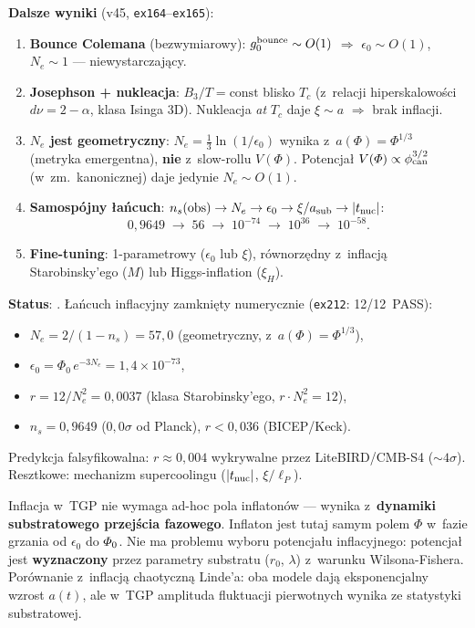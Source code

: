 \begin{remark}
\smallskip\noindent
\textbf{Dalsze wyniki} (v45, \texttt{ex164}--\texttt{ex165}):
\begin{enumerate}[nosep]
  \item \textbf{Bounce Colemana} (bezwymiarowy): $g_0^{\rm bounce} \sim O(1)$
    $\Rightarrow$ $\epsilon_0 \sim O(1)$, $N_e \sim 1$ --- niewystarczaj\k{a}cy.
  \item \textbf{Josephson + nukleacja}: $B_3/T = \text{const}$ blisko $T_c$
    (z~relacji hiperska\-lowości $d\nu = 2-\alpha$, klasa Isinga 3D).
    Nukleacja \emph{at} $T_c$ daje $\xi \sim a$ $\Rightarrow$ brak inflacji.
  \item \textbf{$N_e$ jest geometryczny}: $N_e = \tfrac{1}{3}\ln(1/\epsilon_0)$
    wynika z~$a(\Phi) = \Phi^{1/3}$ (metryka emergentna),
    \textbf{nie} z~slow-rollu $V(\Phi)$.
    Potencja\l{} $V(\Phi) \propto \phi_{\rm can}^{3/2}$ (w~zm.\ kanonicznej)
    daje jedynie $N_e \sim O(1)$.
  \item \textbf{Samospójny \l{}a\'ncuch}: $n_s(\text{obs}) \to N_e \to \epsilon_0
    \to \xi/a_{\rm sub} \to |t_{\rm nuc}|$:
    \[
      0{,}9649 \;\to\; 56 \;\to\; 10^{-74} \;\to\; 10^{36} \;\to\; 10^{-58}.
    \]
  \item \textbf{Fine-tuning}: 1-parametrowy ($\epsilon_0$ lub $\xi$),
    r\'ownorz\k{e}dny z~inflacj\k{a} Starobinsky'ego ($M$)
    lub Higgs-inflation ($\xi_H$).
\end{enumerate}

\smallskip\noindent
\textbf{Status}: .
\L{}a\'ncuch inflacyjny zamkni\k{e}ty numerycznie (\texttt{ex212}: 12/12~PASS):
\begin{itemize}[nosep]
  \item $N_e = 2/(1-n_s) = 57{,}0$ (geometryczny, z~$a(\Phi) = \Phi^{1/3}$),
  \item $\epsilon_0 = \Phi_0\,e^{-3N_e} = 1{,}4 \times 10^{-73}$,
  \item $r = 12/N_e^2 = 0{,}0037$ (klasa Starobinsky'ego, $r \cdot N_e^2 = 12$),
  \item $n_s = 0{,}9649$ ($0{,}0\sigma$ od Planck), $r < 0{,}036$ (BICEP/Keck).
\end{itemize}
Predykcja falsyfikowalna: $r \approx 0{,}004$ wykrywalne przez LiteBIRD/CMB-S4 ($\sim 4\sigma$).
Resztkowe: mechanizm supercoolingu ($|t_{\rm nuc}|$, $\xi/\ell_P$).
\end{remark}

\begin{remark}
Inflacja w~TGP nie wymaga ad-hoc pola inflaton\'ow ---
wynika z~\textbf{dynamiki substratowego przej\'scia fazowego}.
Inflaton jest tutaj samym polem $\Phi$ w~fazie grzania
od $\epsilon_0$ do $\PhiZero$. Nie ma problemu wyboru
potencja\l{}u inflacyjnego: potencja\l{} jest \textbf{wyznaczony}
przez parametry substratu ($r_0$, $\lambda$) z~warunku Wilsona-Fishera.
Por\'ownanie z~inflacj\k{a} chaotyczn\k{a} Linde'a: oba modele
daj\k{a} eksponencjalny wzrost $a(t)$, ale w~TGP amplituda
fluktuacji pierwotnych wynika ze statystyki substratowej.
\end{remark}

